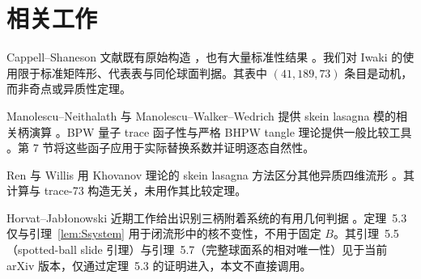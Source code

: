 \section{相关工作}

Cappell--Shaneson 文献既有原始构造 \cite{CappellShaneson1976,AitchisonRubinstein1984}，也有大量标准性结果 \cite{Akbulut2010,Gompf2010,KimYamada2017,Iwaki2024}。我们对 Iwaki 的使用限于标准矩阵形、代表表与同伦球面判据。其表中 $(41,189,73)$ 条目是动机，而非奇点或异质性定理。

Manolescu--Neithalath 与 Manolescu--Walker--Wedrich 提供 skein lasagna 模的相关柄演算 \cite{ManolescuNeithalath2020,ManolescuWalkerWedrich2023}。BPW 量子 trace 函子性与严格 BHPW tangle 理论提供一般比较工具 \cite{BeliakovaPutyraWehrli2019,BeliakovaHogancampPutyraWehrli2023}。第 7 节将这些函子应用于实际替换系数并证明逐态自然性。

Ren 与 Willis 用 Khovanov 理论的 skein lasagna 方法区分其他异质四维流形 \cite{RenWillis2024}。其计算与 trace-73 构造无关，未用作其比较定理。

Horvat--Jab\l{}onowski 近期工作给出识别三柄附着系统的有用几何判据 \cite{HorvatJablonowski2025}。定理~5.3 仅与引理~\ref{lem:Ssystem} 用于闭流形中的核不变性，不用于固定 $B$。其引理~5.5（spotted-ball slide 引理）与引理~5.7（完整球面系的相对唯一性）见于当前 arXiv 版本，仅通过定理~5.3 的证明进入，本文不直接调用。
